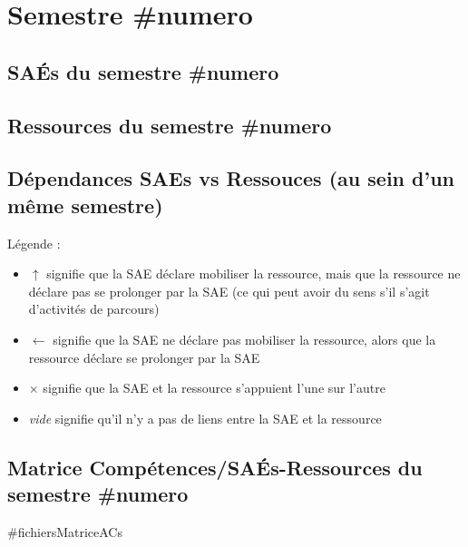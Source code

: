 


\section{Semestre #numero}

\subsection*{SAÉs du semestre #numero}



\subsection*{Ressources du semestre #numero}


\subsection*{Dépendances SAEs vs Ressouces (au sein d'un même semestre)}


Légende :
\begin{itemize}
    \item $\uparrow$ signifie que la SAE déclare mobiliser la ressource, mais que la ressource ne déclare pas se prolonger par la SAE (ce qui peut avoir du sens s'il s'agit d'activités de parcours)
    \item $\leftarrow$ signifie que la SAE ne déclare pas mobiliser la ressource, alors que la ressource déclare se prolonger par la SAE
    \item $\times$ signifie que la SAE et la ressource s'appuient l'une sur l'autre
    \item \textit{vide} signifie qu'il n'y a pas de liens entre la SAE et la ressource
\end{itemize}

\subsection*{Matrice Compétences/SAÉs-Ressources du semestre #numero}

#fichiersMatriceACs


%
%
%
%
\newpage

